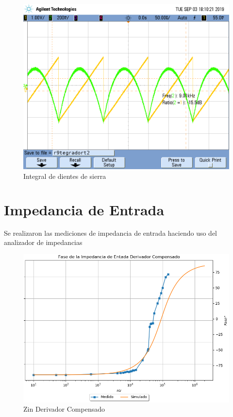 \documentclass[a4paper]{article}
\begin{document}
\begin{figure}[H]
	\centering
	\includegraphics[width=\textwidth]{Ejercicio4/FOTOS-TP2-TC-EJ4/r9tegradort2} 
	\caption{Integral de dientes de sierra}
\end{figure}

\section{Impedancia de Entrada}
Se realizaron las mediciones de impedancia de entrada haciendo uso del analizador de impedancias

\begin{figure}[H]
	\centering
	\includegraphics[width=\textwidth]{Ejercicio4/SUPERPOSICION-ZIN-DERIVADOR-COMPENSADO-FASE} 
	\caption{Zin Derivador Compensado}
\end{figure}
\end{document}

